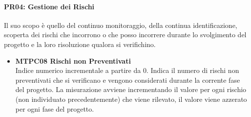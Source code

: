 \paragraph{PR04: Gestione dei Rischi}
Il suo scopo è quello del continuo monitoraggio, della continua identificazione, scoperta dei rischi che incorrono o che posso incorrere durante lo svolgimento del progetto e la loro risoluzione qualora si verifichino.
\begin{itemize}

\item \textbf{MTPC08 Rischi non Preventivati}\-\\
Indice numerico incrementale a partire da 0. Indica il numero di rischi non preventivati che si verificano e vengono considerati durante la corrente fase del progetto. La misurazione avviene incrementando il valore per ogni rischio (non individuato precedentemente) che viene rilevato, il valore viene azzerato per ogni fase del progetto.

\end{itemize}


